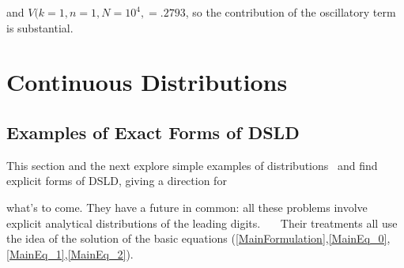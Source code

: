 \documentclass[titlepage,fleqn]{article}%
\begin{document}
\bigskip

\noindent and $V(k=1,n=1,N=10^{4},=.2793$, so the contribution of the
oscillatory term is substantial.

\section{Continuous Distributions}

\subsection{Examples of Exact Forms of DSLD}%

\label{TofD}%


This section and the next explore simple examples of distributions \ and find
explicit forms of DSLD, giving a direction for

what's to come. They have a future in common: all these problems involve
explicit analytical distributions of the leading digits. \newline\ \ \ Their
treatments all use the idea of the solution of the basic equations
(\ref{MainFormulation},\ref{MainEq_0},\ref{MainEq_1},\ref{MainEq_2}).
\end{document}
